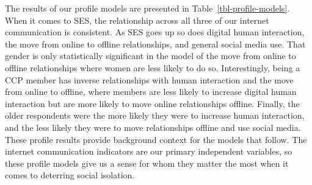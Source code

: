 \documentclass[]{interact}
\theoremstyle{plain}%
\theoremstyle{definition}
\theoremstyle{remark}
\begin{document}
The results of our profile models are presented in
Table~\ref{tbl-profile-models}. When it comes to SES, the relationship
across all three of our internet communication is consistent. As SES
goes up so does digital human interaction, the move from online to
offline relationships, and general social media use. That gender is only
statistically significant in the model of the move from online to
offline relationships where women are less likely to do so.
Interestingly, being a CCP member has inverse relationships with human
interaction and the move from online to offline, where members are less
likely to increase digital human interaction but are more likely to move
online relationships offline. Finally, the older respondents were the
more likely they were to increase human interaction, and the less likely
they were to move relationships offline and use social media. These
profile results provide background context for the models that follow.
The internet communication indicators are our primary independent
variables, so these profile models give us a sense for whom they matter
the most when it comes to deterring social isolation.
\end{document}
